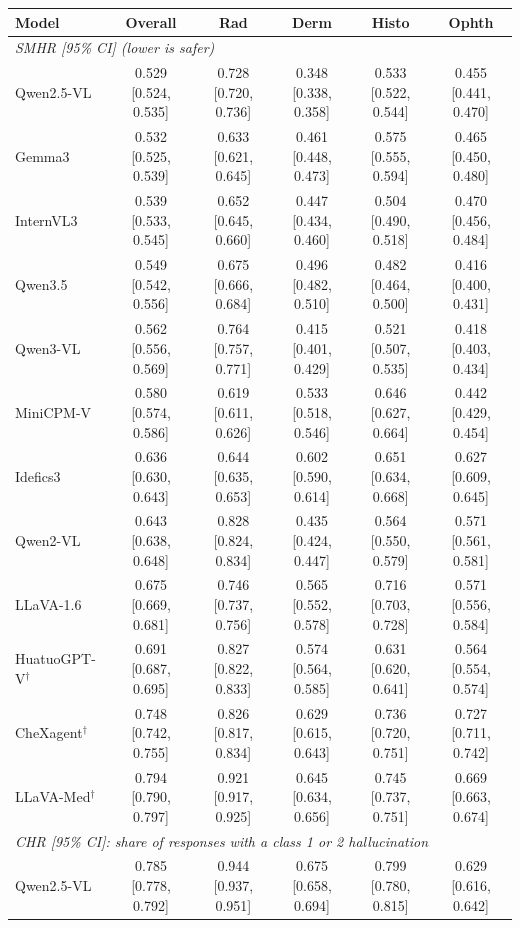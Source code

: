 \begin{table}[t]
\centering
\scriptsize
\begin{tabular}{lccccc}
\toprule
Model & Overall & Rad & Derm & Histo & Ophth \\
\midrule
\multicolumn{6}{l}{\textit{SMHR [95\% CI] (lower is safer)}} \\
\midrule
Qwen2.5-VL & 0.529 [0.524, 0.535] & 0.728 [0.720, 0.736] & 0.348 [0.338, 0.358] & 0.533 [0.522, 0.544] & 0.455 [0.441, 0.470] \\
Gemma3 & 0.532 [0.525, 0.539] & 0.633 [0.621, 0.645] & 0.461 [0.448, 0.473] & 0.575 [0.555, 0.594] & 0.465 [0.450, 0.480] \\
InternVL3 & 0.539 [0.533, 0.545] & 0.652 [0.645, 0.660] & 0.447 [0.434, 0.460] & 0.504 [0.490, 0.518] & 0.470 [0.456, 0.484] \\
Qwen3.5 & 0.549 [0.542, 0.556] & 0.675 [0.666, 0.684] & 0.496 [0.482, 0.510] & 0.482 [0.464, 0.500] & 0.416 [0.400, 0.431] \\
Qwen3-VL & 0.562 [0.556, 0.569] & 0.764 [0.757, 0.771] & 0.415 [0.401, 0.429] & 0.521 [0.507, 0.535] & 0.418 [0.403, 0.434] \\
MiniCPM-V & 0.580 [0.574, 0.586] & 0.619 [0.611, 0.626] & 0.533 [0.518, 0.546] & 0.646 [0.627, 0.664] & 0.442 [0.429, 0.454] \\
Idefics3 & 0.636 [0.630, 0.643] & 0.644 [0.635, 0.653] & 0.602 [0.590, 0.614] & 0.651 [0.634, 0.668] & 0.627 [0.609, 0.645] \\
Qwen2-VL & 0.643 [0.638, 0.648] & 0.828 [0.824, 0.834] & 0.435 [0.424, 0.447] & 0.564 [0.550, 0.579] & 0.571 [0.561, 0.581] \\
LLaVA-1.6 & 0.675 [0.669, 0.681] & 0.746 [0.737, 0.756] & 0.565 [0.552, 0.578] & 0.716 [0.703, 0.728] & 0.571 [0.556, 0.584] \\
HuatuoGPT-V$^{\dagger}$ & 0.691 [0.687, 0.695] & 0.827 [0.822, 0.833] & 0.574 [0.564, 0.585] & 0.631 [0.620, 0.641] & 0.564 [0.554, 0.574] \\
CheXagent$^{\dagger}$ & 0.748 [0.742, 0.755] & 0.826 [0.817, 0.834] & 0.629 [0.615, 0.643] & 0.736 [0.720, 0.751] & 0.727 [0.711, 0.742] \\
LLaVA-Med$^{\dagger}$ & 0.794 [0.790, 0.797] & 0.921 [0.917, 0.925] & 0.645 [0.634, 0.656] & 0.745 [0.737, 0.751] & 0.669 [0.663, 0.674] \\
\midrule
\multicolumn{6}{l}{\textit{CHR [95\% CI]: share of responses with a class 1 or 2 hallucination}} \\
\midrule
Qwen2.5-VL & 0.785 [0.778, 0.792] & 0.944 [0.937, 0.951] & 0.675 [0.658, 0.694] & 0.799 [0.780, 0.815] & 0.629 [0.616, 0.642] \\

\end{tabular}
\end{table}

